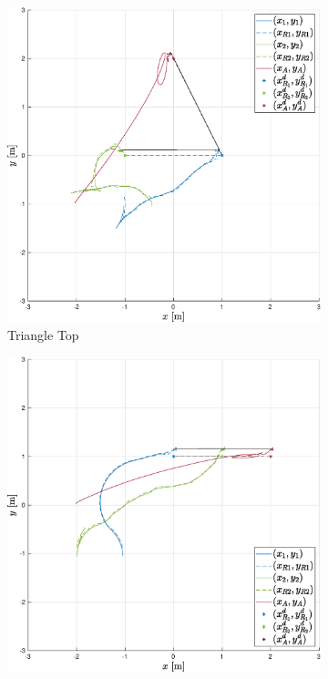 \documentclass{ifacconf}
\begin{document}
\begin{figure}
    \centering
    \begin{subfigure}[b]{0.31\columnwidth}
        \centering
        \includegraphics[width=\linewidth]{images/experiment/nominal/1st_scenario_exp.eps}
        \caption{Triangle Top}
    \end{subfigure}
    \begin{subfigure}[b]{0.31\columnwidth}
        \centering
        \includegraphics[width=\linewidth]{images/experiment/nominal/2nd_scenario_exp.eps}

\end{subfigure}
\end{figure}
\end{document}

